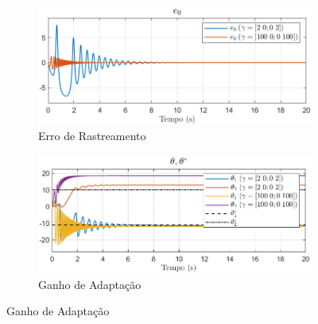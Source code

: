 \documentclass[10pt]{article}
\begin{document}
\begin{figure}[h!]
    \centering
    \begin{subfigure}[b]{0.3\textwidth}
        \centering
        \includegraphics[width=\textwidth]{img/fig07a.png}
        \caption{Erro de Rastreamento}
    \end{subfigure}
    \begin{subfigure}[b]{0.3\textwidth}
        \centering
        \includegraphics[width=\textwidth]{img/fig07b.png}
        \caption{Ganho de Adaptação}
    \end{subfigure}


\end{figure}
\end{document}
